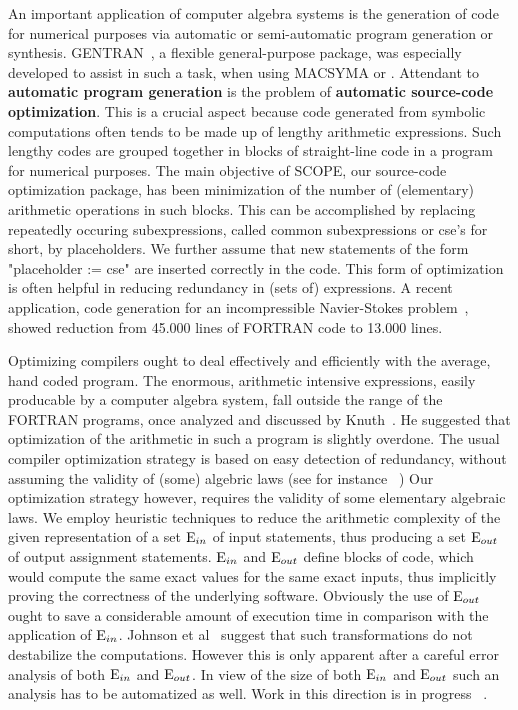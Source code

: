 An important application of computer algebra systems is the generation
of code for numerical purposes via automatic or semi-automatic program
generation or synthesis. 
GENTRAN~\cite{Gates:84,Gates:85,Gates:86,Gates:91}, a flexible general-purpose
package, was especially developed to assist in such a task, when using
MACSYMA or {\REDUCE}.
Attendant to {\bf automatic program generation} is the problem 
of {\bf automatic source-code optimization}. 
This is a crucial aspect because code
generated from symbolic computations often tends to be made up of
lengthy arithmetic expressions. 
Such lengthy codes are grouped together in
blocks of straight-line code in a program for numerical purposes. The
main objective of SCOPE, our source-code optimization package, has been
minimization of the number of (elementary) arithmetic operations in such 
blocks. This can be accomplished by replacing repeatedly occuring
subexpressions, called common subexpressions or cse's for short,
by placeholders. We further assume that new statements of the form
"placeholder := cse" are inserted correctly in the code. This 
form of optimization is often helpful in reducing redundancy in (sets of) 
expressions. A recent application, code generation for an 
incompressible Navier-Stokes problem~\cite{Goldman:95}, showed reduction 
from 45.000 lines of FORTRAN code to 13.000 lines.

Optimizing compilers ought to deal effectively and efficiently with
the average, hand coded program. The enormous, arithmetic intensive
expressions, easily producable by a computer algebra system, fall
outside the range of the FORTRAN programs, once analyzed and discussed
by Knuth~\cite{Knuth:71}. He suggested that optimization of the arithmetic in
such a program is slightly overdone. The usual compiler optimization strategy
is based on easy detection of redundancy, without assuming the validity of
(some) algebric laws (see for instance ~\cite{Gonzales}) 
Our optimization strategy however, requires the validity of
some elementary algebraic laws. We employ heuristic techniques to
reduce the arithmetic complexity of the given representation of a set
${\rm E}_{in}$ of input statements, thus producing a set 
${\rm E}_{out}$ of output assignment statements.
${\rm E}_{in}$ and ${\rm E}_{out}$ define blocks of
code, which would compute the same exact values for the same exact
inputs, thus implicitly proving the correctness of the underlying
software.  Obviously the use of ${\rm E}_{out}$ ought to save a considerable
amount of execution time in comparison with the application of ${\rm
E}_{in}$.  Johnson et al~\cite{Johnson:79} suggest that such
transformations do not destabilize the computations.  However this is only
apparent after a careful error analysis of both ${\rm E}_{in}$ and ${\rm
E}_{out}$.  In view of the size of both ${\rm E}_{in}$ and ${\rm E}_{out}$
such an analysis has to be automatized as well.  Work in this direction is
in progress ~\cite{Hulshof,Molenkamp:91,Molenkamp:94}.

